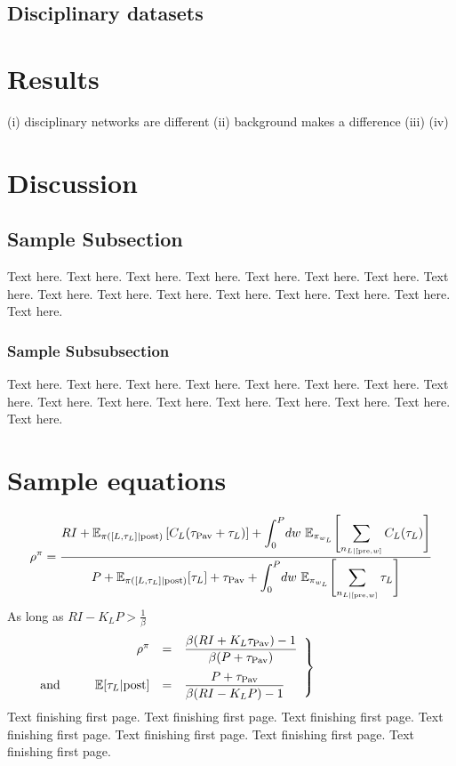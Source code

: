 \documentclass[NETN]{stjour}
\def\taupav{\tau_{\mathrm{Pav}}}
\begin{document}
\subsection{Disciplinary datasets}

\section{Results}

(i) disciplinary networks are different
(ii) background makes a difference
(iii) 
(iv) 

\section{Discussion}

\subsection{Sample Subsection}
Text here. Text here. Text here. Text here.
Text here. Text here. Text here. Text here.
Text here. Text here. Text here. Text here.
Text here. Text here. Text here. Text here.

\subsubsection{Sample Subsubsection}
Text here. Text here. Text here. Text here.
Text here. Text here. Text here. Text here.
Text here. Text here. Text here. Text here.
Text here. Text here. Text here. Text here.


\section{Sample equations}
\begin{equation}
\label{eq:rhoCHT}
\rho^{\pi}= \frac{RI + \mathbb{E}_{\pi([L,\tau_L]|\textrm{post})}
\left[C_L(\taupav+\tau_L) \right]   +
\displaystyle{\int_{0}^{P}}{dw~ \mathbb{E}_{\pi_{w_L}}}
\Biggl[\/\sum_{n_{L|[\textrm{pre},w]}}C_L(\tau_L)
\Biggr]            }      {P +
\mathbb{E}_{\pi([L,\tau_L] |\textrm{post})}[\tau_{L}] +\taupav +
\displaystyle{ \int_{0}^{P}}{dw~ \mathbb{E}_{\pi_{w_L}}}   
\Biggl[\sum_{n_{L|[\textrm{pre},w]}}\tau_L\Biggr]  
}
\end{equation}
As long as
$RI - K_LP > 
\frac{1}{\beta}$
\begin{equation}
\left.\begin{array}{lrcl}
&\rho^{\pi} &=&  \displaystyle\frac{\beta ( RI + K_L \taupav )-1} {\beta
(P+\taupav )}    \\[12pt]
\hbox{and}\hbox to .25in{\hfill}&\mathbb{E}[\tau_L | \text{post}] &=&\displaystyle \frac{P+\taupav}{\beta ( RI -
K_LP)-1}  
\label{eq:analytical_linear}
\end{array}\right\}\hbox to 1.25in{\hfill}
\end{equation} 
Text finishing first page.
Text finishing first page.
Text finishing first page.
Text finishing first page.
Text finishing first page.
Text finishing first page.
Text finishing first page.
\end{document}
